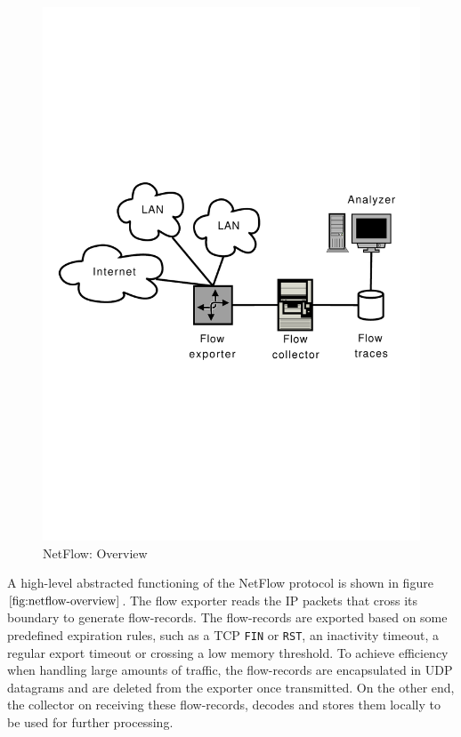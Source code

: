\begin{figure}[h!]
\begin{center}
  \includegraphics* [width=0.7\linewidth]{figures/netflow-overview}	
  \caption{NetFlow: Overview \cite{nmelnikov:thesis:2010}}
  \label{fig:netflow-overview}
\end{center}
\end{figure}
A high-level abstracted functioning of the NetFlow protocol is shown in figure  $\ref{fig:netflow-overview}$. The flow exporter reads the \ac{IP} packets that cross its boundary to generate flow-records. The flow-records are exported based on some  predefined expiration rules, such as a \ac{TCP} \texttt{FIN} or \texttt{RST}, an inactivity timeout, a regular export timeout or crossing a low memory threshold. To achieve efficiency when handling large amounts of traffic, the flow-records are encapsulated in \ac{UDP} datagrams and are deleted from the exporter once transmitted. On the other end, the collector on receiving these flow-records, decodes and stores them locally to be used for further processing.

